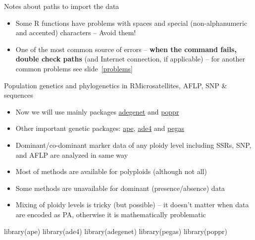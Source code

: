 \documentclass[compress, ucs, xelatex, 11pt, xcolor=svgnames,
  hyperref={
    bookmarks=true,
    unicode=true,
    colorlinks=true,
    pdftitle={Molecular data in R},
    plainpages=false,
    pdfauthor={Vojtech Zeisek},
    pdfsubject={Course about phylogeny and evolution in R},
    pdfcreator={XeLaTeX},
    pdfkeywords={R, evolution, phylogeny, molecular data},
    linkcolor=Tomato,
    anchorcolor=SaddleBrown,
    citecolor=Goldenrod,
    filecolor=DarkMagenta,
    menucolor=Sienna,
    urlcolor=DarkTurquoise,
    pdftex},
  url={hyphens, lowtilde} %
  ]{beamer}
\renewcommand{\texttt}[1]{\hl{\ttfamily #1}}
\begin{document}
\begin{frame}[allowframebreaks]{Notes about paths to import the data}
\begin{itemize}
\begin{itemize}
\begin{itemize}
	\item When going directory up, use one \texttt{..} for each level, e.g. \texttt{FileParameter="../upper/directory/file.txt"}
	\item On UNIX (Mac OS~X, Linux,~\ldots) tilde \texttt{\textasciitilde} means user's home directory (e.g. \texttt{/home/USER/}), so \texttt{FileParameter="\textasciitilde/some/file.txt"} is same as \texttt{FileParameter="/home/USER/some/file.txt"}
      \end{itemize}
      \item If loading data from computer, carefully check the paths or \textbf{use function \texttt{file.choose()} to interactively pick up the file anywhere in the computer} -- it can replace nearly any filename parameter (e.g. \alert{\texttt{FileParameter=file.choose()}})
    \end{itemize}
    \item Some R functions have problems with spaces and special (non-alphanumeric and accented) characters -- Avoid them!
    \item One of the most common source of errors -- \textbf{when the command fails, double check paths} (and Internet connection, if applicable) -- for another common problems see slide~\ref{problems}
  \end{itemize}
\end{frame}

\begin{frame}[fragile]{Population genetics and phylogenetics in R}{Microsatellites, AFLP, SNP \& sequences}
  \begin{multicols}{2}
    \begin{itemize}
      \item Now we will use mainly packages \href{http://adegenet.r-forge.r-project.org/}{adegenet} and \href{http://grunwaldlab.cgrb.oregonstate.edu/poppr-r-package-population-genetics}{poppr}
      \item Other important genetic packages: \href{http://ape-package.ird.fr/}{ape}, \href{http://pbil.univ-lyon1.fr/ADE-4/}{ade4} and \href{http://ape-package.ird.fr/pegas.html}{pegas}
      \item Dominant/co-dominant marker data of any ploidy level including SSRs, SNP, and AFLP are analyzed in same way
      \item Most of methods are available for polyploids (although not all)
      \item Some methods are unavailable for dominant (presence/absence) data
      \item Mixing of ploidy levels is tricky (but possible) -- it doesn't matter when data are encoded as PA, otherwise it is mathematically problematic
    \end{itemize}
    \begin{spluscode}
      library(ape)
      library(ade4)
      library(adegenet)
      library(pegas)
      library(poppr)
    \end{spluscode}
  \end{multicols}
\end{frame}
\end{document}

